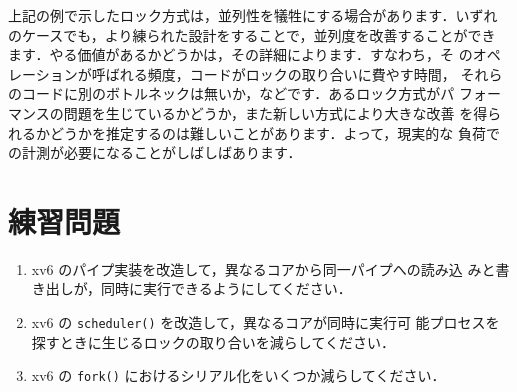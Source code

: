 上記の例で示したロック方式は，並列性を犠牲にする場合があります．いずれ
のケースでも，より練られた設計をすることで，並列度を改善することができ
ます．やる価値があるかどうかは，その詳細によります．すなわち，そ
のオペレーションが呼ばれる頻度，コードがロックの取り合いに費やす時間，
それらのコードに別のボトルネックは無いか，などです．あるロック方式がパ
フォーマンスの問題を生じているかどうか，また新しい方式により大きな改善
を得られるかどうかを推定するのは難しいことがあります．よって，現実的な
負荷での計測が必要になることがしばしばあります．

\section{練習問題}

\begin{enumerate}

\item xv6 のパイプ実装を改造して，異なるコアから同一パイプへの読み込
  みと書き出しが，同時に実行できるようにしてください．

\item xv6 の \texttt{scheduler()} を改造して，異なるコアが同時に実行可
  能プロセスを探すときに生じるロックの取り合いを減らしてください．

\item xv6 の \texttt{fork()} におけるシリアル化をいくつか減らしてください．

\end{enumerate}

